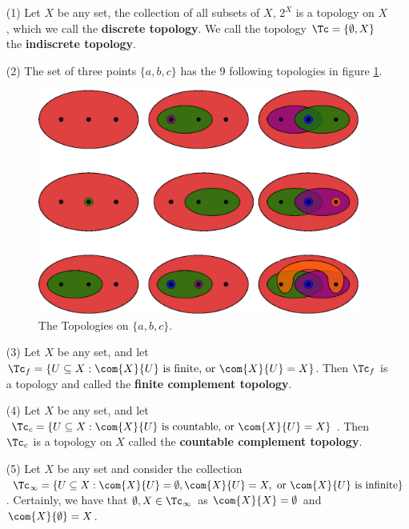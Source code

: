 \begin{example}
    \begin{enumerate}
        \item[(1)] Let $X$ be any set, the collection of all subsets of  $X$,
            $2^X$ is a topology on $X$, which we call the \textbf{discrete
            topology}. We call the topology $\Tc= \{\emptyset, X\}$ the
            \textbf{indiscrete topology}.

        \item[(2)] The set of three points $\{a, b, c\}$ has the  $9$ following
            topologies
            in figure \ref{fig1.1}.
            \begin{figure}[h]
                \centering
                \includegraphics[scale = 0.5]{Figures/chapter1/three_point_topology.eps}
                \caption{The Topologies on $\{a, b, c\}$.}
                \label{fig1.1}
            \end{figure}

        \item[(3)] Let $X$ be any set, and let  $\Tc_f=\{U \subseteq X: \com{X}{U}
                \text{ is finite, or } \com{X}{U}=X\}$. Then  $\Tc_f$ is a
                topology and called the \textbf{finite complement topology}.

        \item[(4)] Let $X$ be any set, and let  $\Tc_c=\{U \subseteq X: \com{X}{U}
                \text{ is countable, or } \com{X}{U}=X\}$. Then  $\Tc_c$ is a
                topology on $X$ called the \textbf{countable complement
                topology}.

            \item[(5)] Let $X$ be any set and consider the collection
                $\Tc_\infty=\{U \subseteq X : \com{{X}}{U}=\emptyset,
                \com{X}{U}=X, \text{ or } \com{X}{U} \text{ is infinite}\}$.
                Certainly, we have that $\emptyset,X \in \Tc_\infty$ as
                $\com{X}{X}=\emptyset$ and $\com{X}{\emptyset}=X$.


\end{enumerate}
\end{example}
